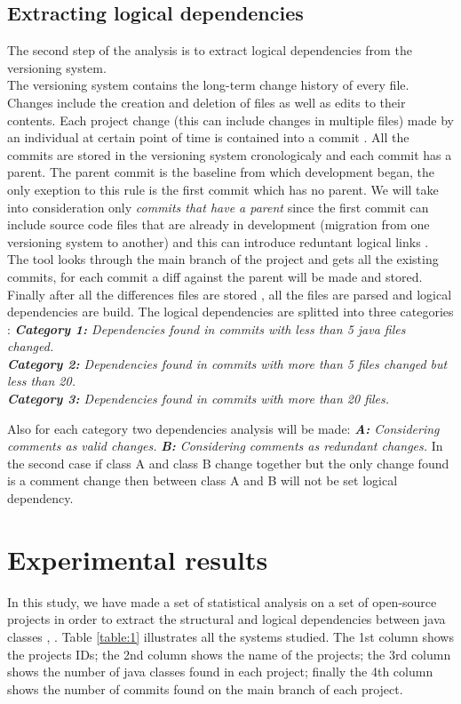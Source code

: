 \documentclass[conference,compsoc]{IEEEtran}
\begin{document}
\subsection{Extracting logical dependencies}
The second step of the analysis is to extract logical dependencies from the versioning system.\\The versioning system contains the long-term change history of every file. Changes include the creation and deletion of files as well as edits to their contents. Each project change (this can include changes in multiple files) made by an individual at certain point of time is contained into a commit \cite{ct7}. All the commits are stored in the versioning system cronologicaly and each commit has a parent. The parent commit is the baseline from which development began, the only exeption to this rule is the first commit which has no parent. We will take into consideration only \textit{commits that have a parent} since the first commit can include source code files that are already in development (migration from one versioning system to another) and this can introduce reduntant logical links \cite{ct8} .\\ The tool looks through the main branch of the project and gets all the existing commits, for each commit a diff against the parent will be made and stored.\\ Finally after all the differences files are stored , all the files are parsed and logical dependencies are build. The logical dependencies are splitted into three categories :
\textit{\textbf{Category 1:} Dependencies found in commits with less than 5 java files changed.}\\
\textit{\textbf{Category 2:} Dependencies found in commits with more than 5 files changed but less than 20. }\\
\textit{\textbf{Category 3:} Dependencies found in commits with more than 20 files.}

Also for each category two dependencies analysis will be made:
\textit{\textbf{A:} Considering comments  as valid changes.}
\textit{\textbf{B:} Considering comments  as redundant changes. }
In the second case if class A and class B change together but the only change found is a comment change then between class A and B will not be set logical dependency.

\section{Experimental results}
In this study, we have made a set of statistical analysis on a set of open-source projects in order to extract the structural and logical dependencies between java classes \cite{ct5}, \cite{ct8} . Table \ref{table:1} illustrates all the systems studied. The 1st column shows the projects IDs; the 2nd column shows the name of the projects; the 3rd column shows the number of java classes found in each project; finally the 4th column shows the number of commits found on the main branch of each project.
\end{document}
